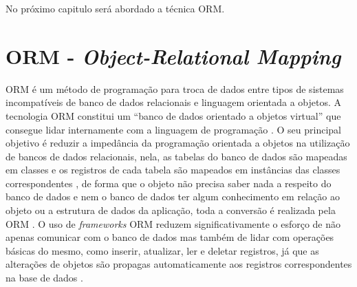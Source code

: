 No próximo capitulo será abordado a técnica ORM.
\section{ORM - \textit{Object-Relational Mapping}}

ORM é um método de programação para troca de dados entre tipos de sistemas incompatíveis de banco de dados relacionais e linguagem orientada a objetos. A tecnologia ORM constitui um ``banco de dados orientado a objetos virtual'' que consegue lidar internamente com a linguagem de programação \cite{nazario2019detecting}. O seu principal objetivo é reduzir a impedância da programação orientada a objetos na utilização de bancos de dados relacionais, nela, as tabelas do banco de dados são mapeadas em classes e os registros de cada tabela são mapeados em instâncias das classes correspondentes \cite{michalsky2012componentes}, de forma que o objeto não precisa saber nada a respeito do banco de dados e nem o banco de dados ter algum conhecimento em relação ao objeto ou a estrutura de dados da aplicação, toda a conversão é realizada pela ORM \cite{fayyaz2014performance}.
O uso de \textit{frameworks} ORM reduzem significativamente o esforço de não apenas comunicar com o banco de dados mas também de lidar com operações básicas do mesmo, como inserir, atualizar, ler e deletar registros, já que as alterações de objetos são propagas automaticamente aos registros correspondentes na base de dados \cite{nazario2019detecting}.